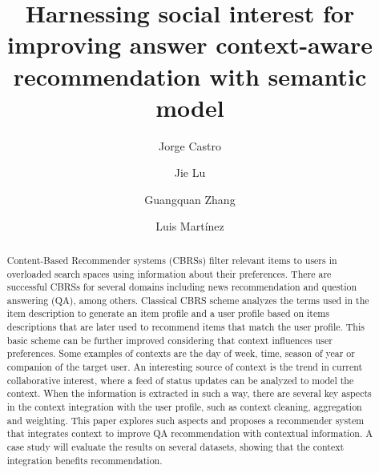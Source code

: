 \documentclass[preprint]{elsarticle}
\begin{document}
\title{Harnessing social interest for improving answer context-aware recommendation with semantic model}

\begin{spacing}{1.5}

\begin{frontmatter}

\author[addressjorge,addressjie]{Jorge Castro}

\author[addressjie]{Jie Lu}

\author[addressjie]{Guangquan Zhang}

\author[addressluis]{Luis Mart\'inez}

\address[addressjorge]{Department of Computer Science and Artificial Intelligence, University of Granada, Granada (Spain)}
\address[addressjie]{School of Software, University of Technology Sydney, Sydney (Australia)}
\address[addressluis]{Computer Science Department, University of Ja\'en, Ja\'en (Spain)}

\begin{abstract}

Content-Based Recommender systems (CBRSs) filter relevant items to users in overloaded search spaces using information about their preferences. There are successful CBRSs for several domains including news recommendation and question answering (QA), among others. Classical CBRS scheme analyzes the terms used in the item description to generate an item profile and a user profile based on items descriptions that are later used to recommend items that match the user profile. This basic scheme can be further improved considering that context influences user preferences. Some examples of contexts are the day of week, time, season of year or companion of the target user. An interesting source of context is the trend in current collaborative interest, where a feed of status updates can be analyzed to model the context. When the information is extracted in such a way, there are several key aspects in the context integration with the user profile, such as context cleaning, aggregation and weighting. This paper explores such aspects and proposes a recommender system that integrates context to improve QA recommendation with contextual information. A case study will evaluate the results on several datasets, showing that the context integration benefits recommendation.


\end{abstract}
\end{frontmatter}
\end{spacing}
\end{document}
